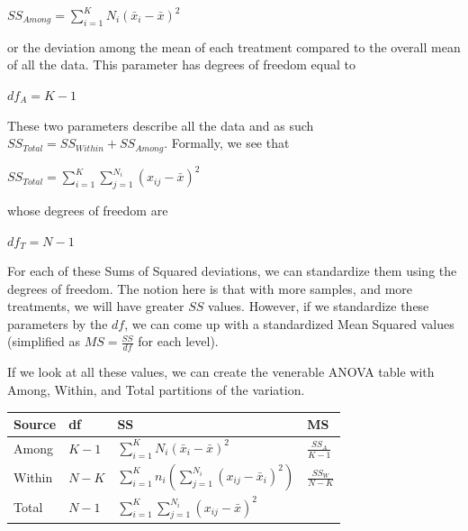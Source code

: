 \documentclass[
  letterpaper,
]{book}
\newcounter{none} %
\begin{document}
\(SS_{Among} = \sum_{i=1}^K N_i\left( \bar{x}_i - \bar{x} \right)^2\)

or the deviation among the mean of each treatment compared to the
overall mean of all the data. This parameter has degrees of freedom
equal to

\(df_{A} = K - 1\)

These two parameters describe all the data and as such
\(SS_{Total} = SS_{Within} + SS_{Among}\). Formally, we see that

\(SS_{Total} = \sum_{i=1}^K\sum_{j=1}^{N_i} (x_{ij} - \bar{x})^2\)

whose degrees of freedom are

\(df_{T} = N - 1\)

For each of these Sums of Squared deviations, we can standardize them
using the degrees of freedom. The notion here is that with more samples,
and more treatments, we will have greater \(SS\) values. However, if we
standardize these parameters by the \(df\), we can come up with a
standardized Mean Squared values (simplified as \(MS = \frac{SS}{df}\)
for each level).

If we look at all these values, we can create the venerable ANOVA table
with Among, Within, and Total partitions of the variation.

{\def\LTcaptype{none} %
\begin{longtable}[]{@{}
  >{\raggedright\arraybackslash}p{}
  >{\raggedright\arraybackslash}p{}
  >{\raggedright\arraybackslash}p{}
  >{\raggedright\arraybackslash}p{}@{}}
\toprule\noalign{}
\begin{minipage}[b]{\linewidth}\raggedright
Source
\end{minipage} & \begin{minipage}[b]{\linewidth}\raggedright
df
\end{minipage} & \begin{minipage}[b]{\linewidth}\raggedright
SS
\end{minipage} & \begin{minipage}[b]{\linewidth}\raggedright
MS
\end{minipage} \\
\midrule\noalign{}
\endhead
\bottomrule\noalign{}
\endlastfoot
Among & \(K-1\) &
\(\sum_{i=1}^K N_i \left( \bar{x}_i - \bar{x} \right)^2\) &
\(\frac{SS_A}{K-1}\) \\
Within & \(N-K\) &
\(\sum_{i=1}^Kn_i\left( \sum_{j=1}^{N_i}(x_{ij}-\bar{x}_i)^2 \right)\) &
\(\frac{SS_W}{N-K}\) \\
Total & \(N-1\) & \(\sum_{i=1}^K \sum_{j=1}^{N_i} (x_{ij} - \bar{x})^2\)
& \\
\end{longtable}
}
\end{document}
